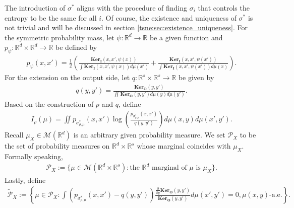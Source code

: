 \documentclass[10pt]{article}
\newenvironment{Proof of lemma}{\noindent{\bf Proof of Lemma}}{\hfill$\Box$\newline}
\newenvironment{Proof of claim}{\noindent{\bf Proof of claim}}{\hfill$\Box$\newline}
\newenvironment{Proof of theorem}{\noindent{\bf Proof of Theorem}}{\hfill\scriptsize{$\Box$}\newline}
\newenvironment{Proof of theorems}{\noindent{\bf Proof of Theorems}}{\hfill$\Box$\newline}
\newenvironment{Proof of proposition}{\noindent{\bf Proof of Proposition}}{\hfill$\Box$\newline}
\newenvironment{Proof of propositions}{\noindent{\bf Proof of Propositions}}{\hfill$\Box$\newline}
\newenvironment{Proof of exercise}{\noindent{\it Proof of Exercise:}}{\hfill$\Box$}
\numberwithin{equation}{section}
\newcommand{\ki}{\mathbf{Ker}_{\mathbf{I}}}
\newcommand{\ko}{\mathbf{Ker}_{\mathbf{O}}}
\begin{document}
The introduction of $\sigma^*$ aligns with the procedure of finding $\sigma_i$ that controls the entropy to be the same for all $i$. Of course, the existence and uniqueness of $\sigma^*$ is not trivial and will be discussed in section \ref{tsne:sec:existence_uniqueness}. For the symmetric probability mass, let $\psi: \mathbb{R}^d \to \mathbb{R}$ be a given function and $p_{\psi}: \mathbb{R}^d \times \mathbb{R}^d \to \mathbb{R}$ be defined by
\begin{align}
    p_{\psi}(x,x') = \frac{1}{2}\left( \frac{\ki(x,x',\psi(x))}{\int \ki(x,x',\psi(x))d\mu(x')} + \frac{\ki(x,x',\psi(x'))}{\int \ki(x,x',\psi(x'))d\mu(x)}\right).
\end{align}
For the extension on the output side, let $q: \mathbb{R}^s \times \mathbb{R}^s \to \mathbb{R}$ be given by
\begin{align}
    q(y,y') = \frac{\ko(y,y')}{\iint \ko(y,y')d\mu(y) d\mu(y')}.
\end{align}
Based on the construction of $p$ and $q$, define
\begin{align}
    I_{\rho}(\mu) = \iint p_{\sigma^*_{\rho,\mu}}(x,x') \log\left(\frac{p_{\sigma^*_{\rho,\mu}}(x,x')}{q(y,y')}\right) d\mu(x,y) d\mu(x',y').
\end{align}
Recall $\mu_X \in \mathcal{M}(\mathbb{R}^d)$ is an arbitrary given probability measure. We set $\mathcal{P}_X$ to be the set of probability measures on $\mathbb{R}^d \times \mathbb{R}^s$ whose marginal coincides with $\mu_X$. Formally speaking,
\begin{align}
    \mathcal{P}_X := \{\mu \in \mathcal{M}(\mathbb{R}^d \times \mathbb{R}^s): \text{the $\mathbb{R}^d$ marginal of $\mu$ is $\mu_X$}\}.
\end{align}
Lastly, define
\begin{align}
    \tilde{\mathcal{P}}_X := \left\{ \mu \in \mathcal{P}_X: \int (p_{\sigma^*_{\rho,\mu}}(x,x')-q(y,y'))\frac{\frac{\partial}{\partial y}\ko{(y,y')}}{\ko{(y,y')}} d\mu(x',y') = 0,\mu(x,y)\text{-a.e.}\right\}.
\end{align}
\end{document}
